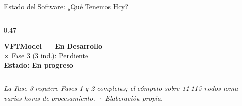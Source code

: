 \begin{frame}{Estado del Software: ¿Qué Tenemos Hoy?}
\begin{columns}[T]
\begin{column}{0.47\textwidth}
\begin{block}{\scriptsize\bfseries VFTModel — En Desarrollo}
{          \hspace{0.8em}{\tiny CF calc. · $T_b$ formulado · Node Score pend.}\\[0.03cm]
          {\color{red!60!black}$\times$} Fase 3 (3 ind.): Pendiente\\[0.08cm]
          \textbf{\color{orange!80!black} Estado: En progreso}}
      \end{block}
    \end{column}
  \end{columns}
  \vspace{0.2cm}
  {\scriptsize\itshape\color{gray!55}
    La Fase 3 requiere Fases 1 y 2 completas; el cómputo sobre
    11,115 nodos toma varias horas de procesamiento. · Elaboración propia.}
\end{frame}


